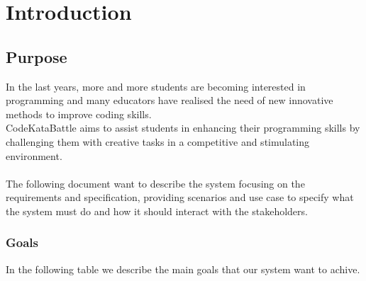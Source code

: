 \chapter{Introduction}

\section{Purpose}
In the last years, more and more students are becoming interested in programming and many educators have realised 
the need of new innovative methods to improve coding skills. \\
CodeKataBattle aims to assist students in enhancing their programming skills by challenging them with creative tasks
 in a competitive and stimulating environment. \\
 \\
 The following document want to describe the system focusing on the requirements and specification, providing scenarios 
 and use case to specify what the system must do and how it should interact with the stakeholders.\\  

 \subsection{Goals}
 In the following table we describe the main goals that our system want to achive.\\
 \begin{table}[H]
    \end{table}
    \clearpage
